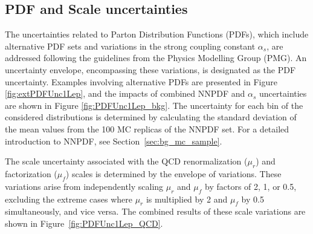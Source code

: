 \subsection{PDF and Scale uncertainties}
\label{subsec:scale_pdf_unc}
The uncertainties related to Parton Distribution Functions (PDFs), which include alternative PDF sets and variations in the strong coupling constant $\alpha_s$, are addressed following the guidelines from the Physics Modelling Group (PMG). 
An uncertainty envelope, encompassing these variations, is designated as the PDF uncertainty. 
Examples involving alternative PDFs are presented in Figure \ref{fig:extPDFUnc1Lep}, and the impacts of combined NNPDF and $\alpha_s$ uncertainties are shown in Figure \ref{fig:PDFUnc1Lep_bkg}.
The uncertainty for each bin of the considered distributions is determined by calculating the standard deviation of the mean values from the 100 MC replicas of the NNPDF set.
For a detailed introduction to NNPDF, see Section~\ref{sec:bg_mc_sample}.

The scale uncertainty associated with the QCD renormalization ($\mu_r$) and factorization ($\mu_f$) scales is determined by the envelope of variations. 
These variations arise from independently scaling $\mu_r$ and $\mu_f$ by factors of 2, 1, or 0.5, 
excluding the extreme cases where $\mu_r$ is multiplied  by 2 and $\mu_f$ by 0.5 simultaneously, and vice versa.
The combined results of these scale variations are shown in Figure~\ref{fig:PDFUnc1Lep_QCD}.

